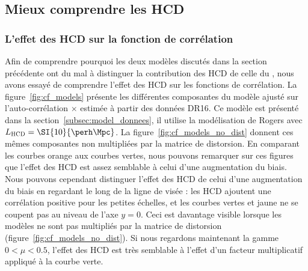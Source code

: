 \subsection{Mieux comprendre les HCD}
\label{subsec:comprendre_hcd}

\subsubsection{L'effet des HCD sur la fonction de corrélation}
Afin de comprendre pourquoi les deux modèles discutés dans la section précédente ont du mal à distinguer la contribution des HCD de celle du \lya{}, nous avons essayé de comprendre l'effet des HCD sur les fonctions de corrélation.
La figure~\ref{fig:cf_models} présente les différentes composantes du modèle ajusté sur l'auto-corrélation \lya{}$\times$\lya{} estimée à partir des données DR16. Ce modèle est présenté dans la section~\ref{subsec:model_donnees}, il utilise la modélisation de Rogers avec  $L_{\textsc{HCD}} = \SI{10}{\perh\Mpc}$.
La figure~\ref{fig:cf_models_no_dist} donnent ces mêmes composantes non multipliées par la matrice de distorsion.
  En comparant les courbes orange aux courbes vertes, nous pouvons remarquer sur ces figures que l'effet des HCD est assez semblable à celui d'une augmentation du biais.
  Nous pouvons cependant distinguer l'effet des HCD de celui d'une augmentation du biais en regardant le long de la ligne de visée : les HCD ajoutent une corrélation positive pour les petites échelles, et les courbes vertes et jaune ne se coupent pas au niveau de l'axe $y = 0$.
  Ceci est davantage visible lorsque les modèles ne sont pas multipliés par la matrice de distorsion (figure~\ref{fig:cf_models_no_dist}).
  Si nous regardons maintenant la gamme $0 < \mu < \num{0.5}$, l'effet des HCD est très semblable à l'effet d'un facteur multiplicatif appliqué à la courbe verte.

